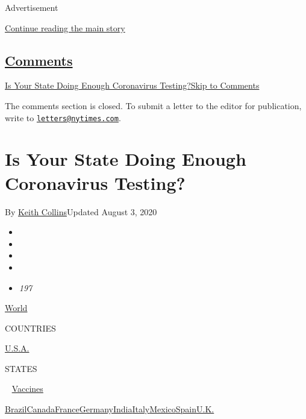 Advertisement

\protect\hyperlink{after-top}{Continue reading the main story}

\hypertarget{comments}{%
\subsection{\texorpdfstring{\protect\hyperlink{commentsContainer}{Comments}}{Comments}}\label{comments}}

\href{}{Is Your State Doing Enough Coronavirus Testing?}\href{}{Skip to
Comments}

The comments section is closed. To submit a letter to the editor for
publication, write to
\href{mailto:letters@nytimes.com}{\nolinkurl{letters@nytimes.com}}.

\hypertarget{is-your-state-doing-enough-coronavirus-testing}{%
\section{Is Your State Doing Enough Coronavirus
Testing?}\label{is-your-state-doing-enough-coronavirus-testing}}

By \href{https://www.nytimes.com/by/keith-collins}{Keith Collins}Updated
August 3, 2020

\begin{itemize}
\item
\item
\item
\item
\item
  \emph{197}
\end{itemize}

\href{https://www.nytimes.com/interactive/2020/world/coronavirus-maps.html}{World}~

COUNTRIES

\textbar{}
\href{https://www.nytimes.com/interactive/2020/us/coronavirus-us-cases.html}{U.S.A.}~

STATES

~
\href{https://www.nytimes.com/interactive/2020/science/coronavirus-vaccine-tracker.html}{Vaccines}

\href{https://www.nytimes.com/interactive/2020/world/americas/brazil-coronavirus-cases.html}{Brazil}\href{https://www.nytimes.com/interactive/2020/world/canada/canada-coronavirus-cases.html}{Canada}\href{https://www.nytimes.com/interactive/2020/world/europe/france-coronavirus-cases.html}{France}\href{https://www.nytimes.com/interactive/2020/world/europe/germany-coronavirus-cases.html}{Germany}\href{https://www.nytimes.com/interactive/2020/world/asia/india-coronavirus-cases.html}{India}\href{https://www.nytimes.com/interactive/2020/world/europe/italy-coronavirus-cases.html}{Italy}\href{https://www.nytimes.com/interactive/2020/world/americas/mexico-coronavirus-cases.html}{Mexico}\href{https://www.nytimes.com/interactive/2020/world/europe/spain-coronavirus-cases.html}{Spain}\href{https://www.nytimes.com/interactive/2020/world/europe/united-kingdom-coronavirus-cases.html}{U.K.}


